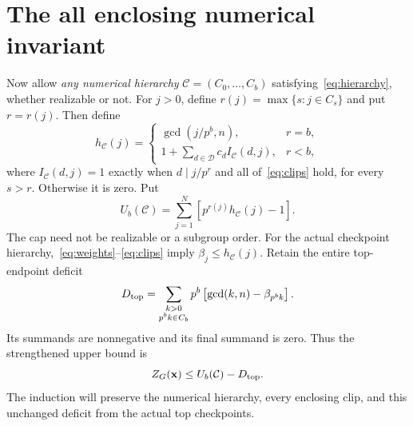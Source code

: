 \documentclass[11pt,letterpaper]{article}
\theoremstyle{definition}\newtheorem{definition}{Definition}
\newcommand{\D}{\mathcal D}
\newcommand{\C}{\mathcal C}
\begin{document}
\section{The all enclosing numerical invariant}\label{sec:clips}
Now allow \emph{any numerical hierarchy} $\C=(C_0,\ldots,C_b)$ satisfying~\eqref{eq:hierarchy}, whether realizable or not. For $j>0$, define $r(j)=\max\{s:j\in C_s\}$ and put $r=r(j)$. Then define
\begin{equation}
h_{\C}(j)=
\begin{cases}
\gcd(j/p^b,n),&r=b,\\
1+\displaystyle\sum_{d\in\D}c_d I_{\C}(d,j),&r<b,
\end{cases}\label{eq:cap}
\end{equation}
where $I_{\C}(d,j)=1$ exactly when $d\mid j/p^r$ and all of~\eqref{eq:clips} hold, for every $s>r$. Otherwise it is zero. Put
\begin{equation}
U_b(\C)=\sum_{j=1}^{N}\left[p^{r(j)}h_{\C}(j)-1\right].\label{eq:invariant}
\end{equation}
The cap need not be realizable or a subgroup order. For the actual checkpoint hierarchy,~\eqref{eq:weights}--\eqref{eq:clips} imply $\beta_j\le h_{\C}(j)$. Retain the entire top-endpoint deficit
\begin{equation}
D_{\rm top}=\sum_{\substack{k>0\\p^bk\in C_b}}
 p^b\left[\gcd(k,n)-\beta_{p^bk}\right].\label{eq:deficit}
\end{equation}
Its summands are nonnegative and its final summand is zero. Thus the strengthened upper bound is
\begin{equation}
Z_G(\mathbf{x})\le U_b(\C)-D_{\rm top}.\label{eq:strongcap}
\end{equation}
The induction will preserve the numerical hierarchy, every enclosing clip, and this unchanged deficit from the actual top checkpoints.
\end{document}
